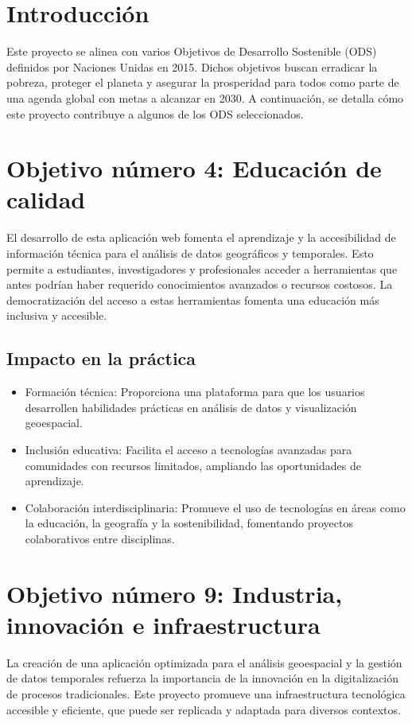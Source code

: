 
\section{Introducción}
Este proyecto se alinea con varios Objetivos de Desarrollo Sostenible (ODS)~\cite{ODS} definidos por Naciones Unidas en 2015. Dichos objetivos buscan erradicar la pobreza, proteger el planeta y asegurar la prosperidad para todos como parte de una agenda global con metas a alcanzar en 2030. A continuación, se detalla cómo este proyecto contribuye a algunos de los ODS seleccionados.

\section{Objetivo número 4: Educación de calidad}
El desarrollo de esta aplicación web fomenta el aprendizaje y la accesibilidad de información técnica para el análisis de datos geográficos y temporales. Esto permite a estudiantes, investigadores y profesionales acceder a herramientas que antes podrían haber requerido conocimientos avanzados o recursos costosos. La democratización del acceso a estas herramientas fomenta una educación más inclusiva y accesible.

\subsection{Impacto en la práctica}
\begin{itemize}
    \item Formación técnica: Proporciona una plataforma para que los usuarios desarrollen habilidades prácticas en análisis de datos y visualización geoespacial.
    \item Inclusión educativa: Facilita el acceso a tecnologías avanzadas para comunidades con recursos limitados, ampliando las oportunidades de aprendizaje.
    \item Colaboración interdisciplinaria: Promueve el uso de tecnologías en áreas como la educación, la geografía y la sostenibilidad, fomentando proyectos colaborativos entre disciplinas.
\end{itemize}

\section{Objetivo número 9: Industria, innovación e infraestructura}
La creación de una aplicación optimizada para el análisis geoespacial y la gestión de datos temporales refuerza la importancia de la innovación en la digitalización de procesos tradicionales. Este proyecto promueve una infraestructura tecnológica accesible y eficiente, que puede ser replicada y adaptada para diversos contextos.

